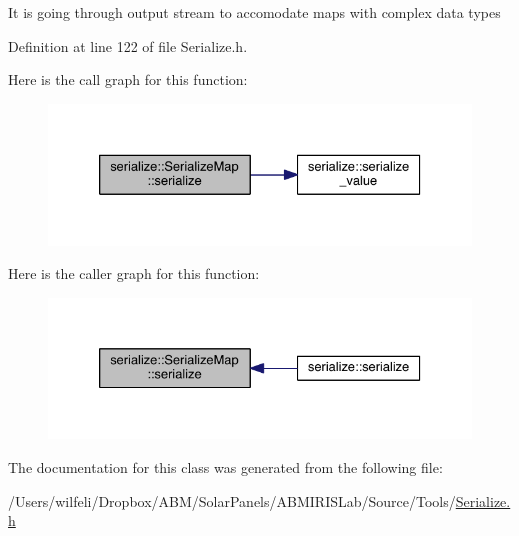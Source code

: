 It is going through output stream to accomodate maps with complex data types 

Definition at line 122 of file Serialize.\+h.



Here is the call graph for this function\+:\nopagebreak
\begin{figure}[H]
\begin{center}
\leavevmode
\includegraphics[width=330pt]{classserialize_1_1_serialize_map_a5c22ada5923b1d8b547cec4950dd357c_cgraph}
\end{center}
\end{figure}




Here is the caller graph for this function\+:\nopagebreak
\begin{figure}[H]
\begin{center}
\leavevmode
\includegraphics[width=330pt]{classserialize_1_1_serialize_map_a5c22ada5923b1d8b547cec4950dd357c_icgraph}
\end{center}
\end{figure}




The documentation for this class was generated from the following file\+:\begin{DoxyCompactItemize}
\item 
/\+Users/wilfeli/\+Dropbox/\+A\+B\+M/\+Solar\+Panels/\+A\+B\+M\+I\+R\+I\+S\+Lab/\+Source/\+Tools/\hyperlink{_serialize_8h}{Serialize.\+h}\end{DoxyCompactItemize}
